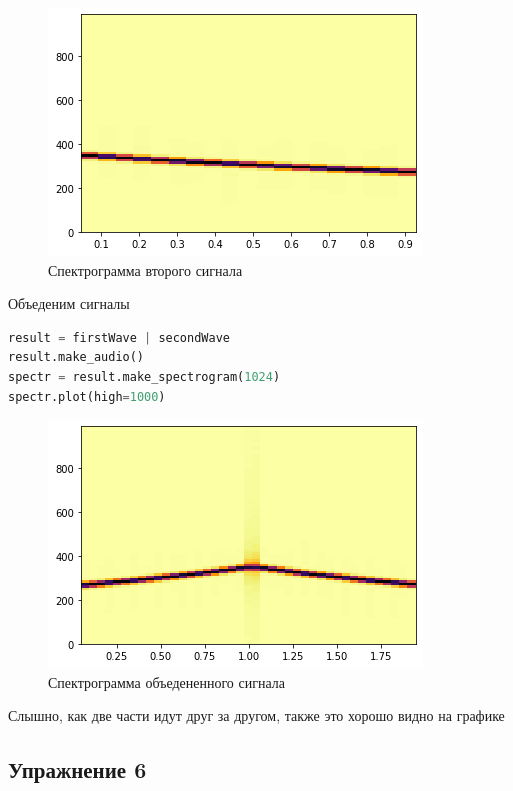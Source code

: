 \begin{figure}[H]
	\begin{center}
		\includegraphics[scale=1]{fig/lab03/lab03_8.png}
		\caption{Спектрограмма второго сигнала}
	\end{center}
\end{figure}

Объеденим сигналы

\begin{lstlisting}[language=Python]
result = firstWave | secondWave
result.make_audio()
spectr = result.make_spectrogram(1024)
spectr.plot(high=1000)
\end{lstlisting}

\begin{figure}[H]
	\begin{center}
		\includegraphics[scale=1]{fig/lab03/lab03_9.png}
		\caption{Спектрограмма объедененного сигнала}
	\end{center}
\end{figure}

Слышно, как две части идут друг за другом, также это хорошо видно на графике

\subsection{Упражнение 6}


